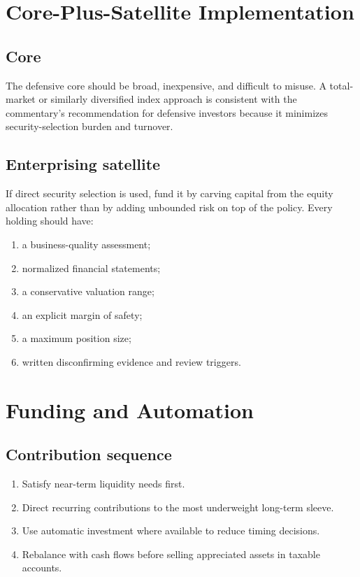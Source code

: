 \documentclass[11pt]{article}
\begin{document}
\section{Core-Plus-Satellite Implementation}
\subsection{Core}
The defensive core should be broad, inexpensive, and difficult to misuse. A total-market or similarly diversified index approach is consistent with the commentary's recommendation for defensive investors because it minimizes security-selection burden and turnover.

\subsection{Enterprising satellite}
If direct security selection is used, fund it by carving capital from the equity allocation rather than by adding unbounded risk on top of the policy. Every holding should have:
\begin{enumerate}
\item a business-quality assessment;
\item normalized financial statements;
\item a conservative valuation range;
\item an explicit margin of safety;
\item a maximum position size;
\item written disconfirming evidence and review triggers.
\end{enumerate}

\section{Funding and Automation}
\subsection{Contribution sequence}
\begin{enumerate}
\item Satisfy near-term liquidity needs first.
\item Direct recurring contributions to the most underweight long-term sleeve.
\item Use automatic investment where available to reduce timing decisions.
\item Rebalance with cash flows before selling appreciated assets in taxable accounts.
\end{enumerate}
\end{document}
